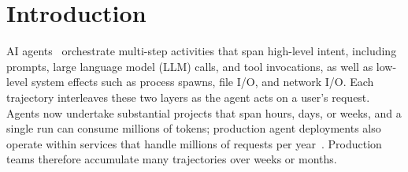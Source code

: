 \documentclass[letterpaper]{article}
\newcommand{\sys}{\textsc{AgentProf}\xspace}
\begin{document}
\begin{abstract}
{attribution} and \emph{stack construction} algorithms to compile local
agent trajectories into pprof-compatible profiles.
We evaluate \sys on 325 real Codex and Claude trajectories containing
183{,}714 system observations and on public annotated trajectories, using four
datasets with 34{,}539 task-operation instances for localization and nine datasets with
13{,}265 operations for tag accuracy.
Semantic profiling separates over 90\% of system-effect cost that
per-session views cannot attribute to task categories, locates
annotated problems while inspecting 9.4\% of work in the top five
groups, uses 45\% fewer groups than per-session grouping, and derives tags
that agree with ground truth on 7 of 9 held-out datasets.
\end{abstract}

\section{Introduction}
\label{sec:intro}

AI agents~\cite{sweagent,claudecode,osworld} orchestrate multi-step
activities that span high-level intent, including prompts, large language
model (LLM) calls, and tool invocations, as well as low-level system effects
such as process spawns, file I/O, and network I/O.
Each trajectory interleaves these two layers as the agent acts on a
user's request.
Agents now undertake substantial projects that span hours, days, or weeks, and
a single run can consume millions of tokens; production agent deployments also
operate within services that handle millions of requests per
year~\cite{openaicodexapp,openaisupportagents}.
Production teams therefore accumulate many trajectories over weeks or months.
\end{document}
